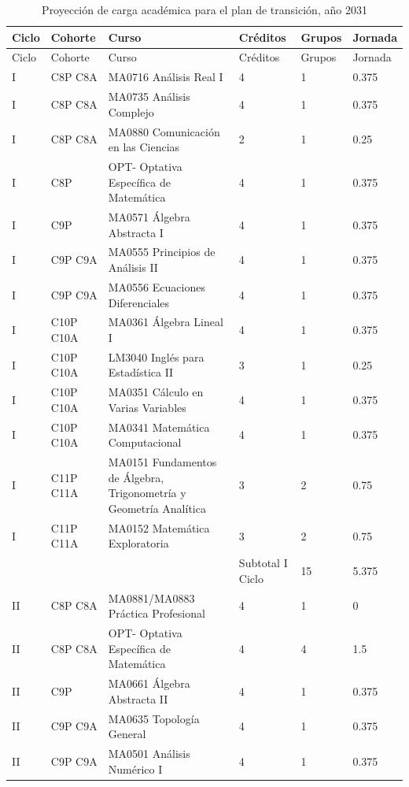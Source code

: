 \begin{longtable}[c]{|p{0.8cm}|p{1.8cm}|p{6.8cm}|p{1.5cm}|p{1.3cm}|p{1.5cm}|}
\caption{Proyección de carga académica para el plan de transición, año 2031}
\label{tab:carga2031}\\
\hline
\rowcolor[HTML]{00C0F3}
Ciclo & Cohorte & Curso & Créditos & Grupos & Jornada \\ \hline
\endfirsthead
\hline
\rowcolor[HTML]{00C0F3}
Ciclo & Cohorte & Curso & Créditos & Grupos & Jornada \\ \hline
\endhead
%
I & C8P C8A & MA0716 Análisis Real I & 4 & 1 & 0.375 \\ \hline
I & C8P C8A & MA0735 Análisis Complejo & 4 & 1 & 0.375 \\ \hline
I & C8P C8A & MA0880 Comunicación en las Ciencias & 2 & 1 & 0.25 \\ \hline
I & C8P & OPT- Optativa Específica de Matemática & 4 & 1 & 0.375 \\ \hline
I & C9P & MA0571 Álgebra Abstracta I & 4 & 1 & 0.375 \\ \hline
I & C9P C9A & MA0555 Principios de Análisis II & 4 & 1 & 0.375 \\ \hline
I & C9P C9A & MA0556 Ecuaciones Diferenciales & 4 & 1 & 0.375 \\ \hline
I & C10P C10A & MA0361 Álgebra Lineal I & 4 & 1 & 0.375 \\ \hline
I & C10P C10A & LM3040 Inglés para Estadística II & 3 & 1 & 0.25 \\ \hline
I & C10P C10A & MA0351 Cálculo en Varias Variables & 4 & 1 & 0.375 \\ \hline
I & C10P C10A & MA0341 Matemática Computacional & 4 & 1 & 0.375 \\ \hline
I & C11P C11A & MA0151 Fundamentos de Álgebra, Trigonometría y Geometría Analítica & 3 & 2 & 0.75 \\ \hline
I & C11P C11A & MA0152 Matemática Exploratoria & 3 & 2 & 0.75 \\ \hline
 &  &  & Subtotal I Ciclo & 15 & 5.375 \\ \hline
II & C8P C8A & MA0881/MA0883 Práctica Profesional & 4 & 1 & 0 \\ \hline
II & C8P C8A & OPT- Optativa Específica de Matemática & 4 & 4 & 1.5 \\ \hline
II & C9P & MA0661 Álgebra Abstracta II & 4 & 1 & 0.375 \\ \hline
II & C9P C9A & MA0635 Topología General & 4 & 1 & 0.375 \\ \hline
II & C9P C9A & MA0501 Análisis Numérico I & 4 & 1 & 0.375 \\ \hline

\end{longtable}
